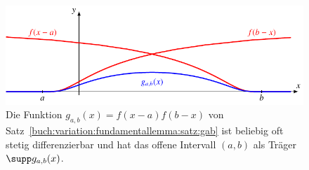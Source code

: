 %
%
%
\begin{figure}
\centering
\includegraphics{chapters/020-variation/images/g.pdf}
\caption{Die Funktion $g_{a,b}(x)=f(x-a)f(b-x)$ von
Satz~\ref{buch:variation:fundamentallemma:satz:gab} ist beliebig
oft stetig differenzierbar und hat das offene Intervall $(a,b)$
als Träger $\supp g_{a,b}(x)$.
\label{buch:variation:fundamentallemma:fig:gab}}
\end{figure}

